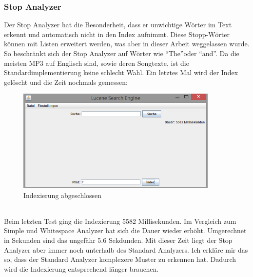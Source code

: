 \documentclass[12pt,a4paper,ngerman]{report}
\begin{document}
\subsubsection{Stop Analyzer}
Der Stop Analyzer hat die Besonderheit, dass er unwichtige Wörter im Text erkennt und automatisch nicht in den Index aufnimmt. Diese Stopp-Wörter können mit Listen erweitert werden, was aber in dieser Arbeit weggelassen wurde. So beschränkt sich der Stop Analyzer auf Wörter wie \textquotedblleft The\textquotedblright oder \textquotedblleft and\textquotedblright . Da die meisten MP3 auf Englisch sind, sowie deren Songtexte, ist die Standardimplementierung keine schlecht Wahl.
\newpage
Ein letztes Mal wird der Index gelöscht und die Zeit nochmals gemessen:
\begin{figure}[h!]
\centering
\includegraphics[width=10cm]{img/stop-analyzer-index.png}
\caption{Indexierung abgeschlossen\protect\footnotemark}
\end{figure}
\\
Beim letzten Test ging die Indexierung 5582 Millisekunden. Im Vergleich zum Simple und Whitespace Analyzer hat sich die Dauer wieder erhöht. Umgerechnet in Sekunden sind das ungefähr 5.6 Sekdunden. Mit dieser Zeit liegt der Stop Analyzer aber immer noch unterhalb des Standard Analyzers. Ich erkläre mir das so, dass der Standard Analyzer komplexere Muster zu erkennen hat. Dadurch wird die Indexierung entsprechend länger brauchen.
\end{document}
